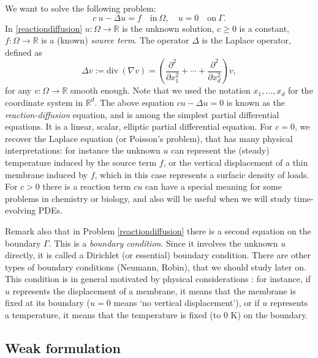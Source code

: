 \documentclass{article}
\begin{document}
We want to solve the following problem:
\begin{equation}\label{reactiondiffusion}
c\ u - \Delta u = f \quad \mathrm{in}\ \Omega, \quad u = 0 \quad \mathrm{on}\ \Gamma.
\end{equation}
In \eqref{reactiondiffusion} $u : \Omega \rightarrow \mathbb{R}$ is the unknown solution, $c\geq0$ is a constant, $f : \Omega \rightarrow \mathbb{R}$ is a (known) \emph{source term}. The operator $\Delta$ is the Laplace operator, defined as
\[
\Delta v := \mathrm{div}\ (\nabla v) =
\left ( \frac{\partial^2}{\partial x_1^2} + \cdots +
\frac{\partial^2}{\partial x_d^2} \right ) v,
\]
for any $v : \Omega \rightarrow \mathbb{R}$ smooth enough. Note that we used the notation $x_1, \ldots, x_d$ for the coordinate system in $\mathbb{R}^d$. The above equation $c u - \Delta u = 0$ is known as the \emph{reaction-diffusion} equation, and is among the simplest partial differential equations. It is a linear, scalar, elliptic partial differential equation. For $c=0$, we recover the Laplace equation (or Poisson's problem), that has many physical interpretations: for instance the unknown $u$ can represent the (steady) temperature induced by the source term $f$, or the vertical displacement of a thin membrane induced by $f$, which in this case represents a surfacic density of loads. 
For $c>0$ there is a reaction term $cu$ can have a special meaning for some problems in chemistry or biology, and also will be useful when we will study time-evolving PDEs.

Remark also that in Problem \eqref{reactiondiffusion} there is a second equation on the boundary $\Gamma$. This is a \emph{boundary condition}. Since it involves the unknown $u$ directly, it is called a Dirichlet (or essential) boundary condition. There are other types of boundary conditions (Neumann, Robin), that we should study later on.
This condition is in general motivated by physical considerations : for instance, if $u$ represents the displacement of a membrane, it means that the membrane is fixed at its boundary ($u=0$ means `no vertical displacement'), or if $u$ represents a temperature, it means that the temperature is fixed (to $0$ K) on the boundary. 

\subsection{Weak formulation}
\end{document}
